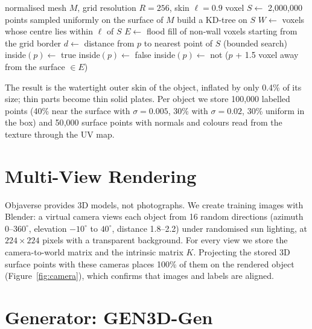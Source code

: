 \begin{algorithm}[H]
\caption{Occupancy labelling by flood fill}
\label{alg:occ}
\begin{algorithmic}[1]
\Require normalised mesh $M$, grid resolution $R=256$, skin $\ell = 0.9$ voxel
\State $S \gets$ 2{,}000{,}000 points sampled uniformly on the surface of $M$
\State build a KD-tree on $S$
\State $W \gets$ voxels whose centre lies within $\ell$ of $S$ 
\State $E \gets$ flood fill of non-wall voxels starting from the grid border 
  \State $d \gets$ distance from $p$ to nearest point of $S$ (bounded search)
   \State inside$(p) \gets$ true 
   \State inside$(p) \gets$ false
  \Else \State inside$(p) \gets$ not ($p$ + 1.5 voxel away from the surface $\in E$)
  \EndIf
\EndFor
\end{algorithmic}
\end{algorithm}

The result is the watertight outer skin of the object, inflated by only 0.4\% of its size; thin parts become thin solid plates. Per object we store 100{,}000 labelled points (40\% near the surface with $\sigma=0.005$, 30\% with $\sigma=0.02$, 30\% uniform in the box) and 50{,}000 surface points with normals and colours read from the texture through the UV map.

\section{Multi-View Rendering}
Objaverse provides 3D models, not photographs. We create training images with Blender: a virtual camera views each object from 16 random directions (azimuth $0$--$360^\circ$, elevation $-10^\circ$ to $40^\circ$, distance 1.8--2.2) under randomised sun lighting, at $224\times224$ pixels with a transparent background. For every view we store the camera-to-world matrix and the intrinsic matrix $K$. Projecting the stored 3D surface points with these cameras places 100\% of them on the rendered object (Figure~\ref{fig:camera}), which confirms that images and labels are aligned.

\section{Generator: GEN3D-Gen}
